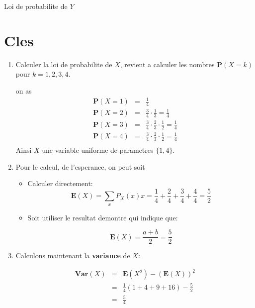 \documentclass[a4paper]{tufte-handout}
\begin{document}
\begin{itemize}
  \begin{marginfigure}
      \centering
      \caption{Loi de probabilite de $Y$}
  \end{marginfigure}
  

\end{itemize}
\section{Cles}

\begin{enumerate}
  \item 
Calculer la loi de probabilite de $X$, revient a calculer les nombres
$\mathbf{P}(X=k)$ pour $k = 1, 2,3,4$.

on as 
\begin{eqnarray*}
  \mathbf{P}(X = 1) & = & \frac{1}{4}\\
  \mathbf{P}(X = 2) & = & \frac{3}{4}\cdot\frac{1}{3} = \frac{1}{4}\\
  \mathbf{P}(X = 3) & = & \frac{3}{4}\cdot\frac{2}{3}\cdot\frac{1}{2} = \frac{1}{4}\\
  \mathbf{P}(X = 4) & = &\frac{3}{4}\cdot\frac{2}{3}\cdot\frac{1}{2} = \frac{1}{4} \\
\end{eqnarray*}
Ainsi $X$ une variable uniforme de parametres $\{1, 4\}$.
\item Pour le calcul, de l'esperance, on peut soit 
  \begin{itemize}
    \item Calculer directement:
      $$
      \mathbf{E}(X) = \sum_x P_X(x)x = \frac{1}{4} + \frac{2}{4} + \frac{3}{4} +
      \frac{4}{4} = \frac{5}{2}
      $$
    \item Soit utiliser le resultat demontre qui indique que:

      $$
      \mathbf{E}(X) = \frac{a +b}{2} = \frac{5}{2}
      $$
  \end{itemize}
\item Calculons maintenant la \textbf{variance} de $X$:
      
    \begin{eqnarray*}
      \textbf{Var}(X) &=& \textbf{E}(X^2) - (\mathbf{E}(X))^2\\
                      &=& \frac{1}{4}\left(1 + 4 + 9 + 16\right)- \frac{5}{2}\\
                      &=& \frac{5}{4}
    \end{eqnarray*}
\end{enumerate}
\end{document}
